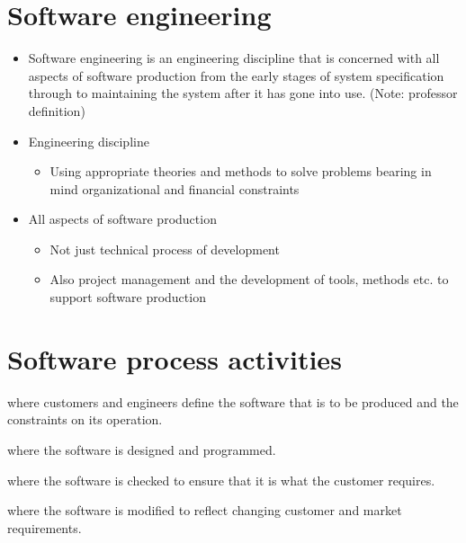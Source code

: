 \documentclass{report}
\begin{document}
\section{Software engineering}
\begin{itemize}
  \addtolength{\itemindent}{0cm}
  \setlength\itemsep{-.25em}
  \item Software engineering is an engineering discipline that is concerned with all aspects of software production from the early stages of system specification through to maintaining the system after it has gone into use. (Note: professor definition)
  \item Engineering discipline
  \begin{itemize}
    \setlength\itemsep{-.25em}
    \item Using appropriate theories and methods to solve problems bearing in mind
organizational and financial constraints
\end{itemize}
  \item All aspects of software production
  \begin{itemize}
    \setlength\itemsep{-.25em}
    \item Not just technical process of development
    \item Also project management and the development of tools, methods etc. to support software production
  \end{itemize}
\end{itemize}

\section{Software process activities}
\begin{description}
  \addtolength{\itemindent}{0cm}
  \setlength\itemsep{-.25em}
  \item [Software specification] where customers and engineers
define the software that is to be produced and the constraints on its operation.
  \item [Software development] where the software is designed and programmed.
  \item [Software validation] where the software is checked to ensure that it is what the customer requires.
  \item [Software evolution] where the software is modified to reflect changing customer and market requirements.
\end{description}

\newpage
\end{document}
